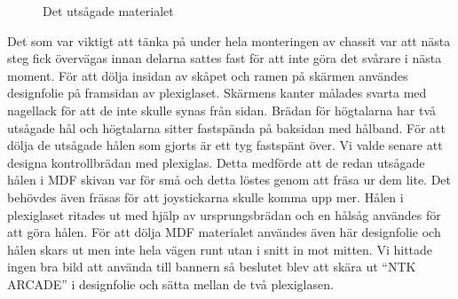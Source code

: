 \documentclass[12pt,fleqn,openany]{book} %
\begin{document}
\begin{table}[h]
\centering
\caption{Material som användes}
\label{table_material}
\end{table}

\begin{wrapfigure}[17]{R}{0.35\textwidth}
  \begin{center}
  \end{center}
  \caption{Det utsågade materialet}
  \label{fig_material}
\end{wrapfigure}
\newpage
Det som var viktigt att tänka på under hela monteringen av chassit var att nästa steg fick övervägas innan delarna sattes fast 
för att inte göra det svårare i nästa moment. För att dölja insidan av skåpet och ramen på skärmen användes designfolie på framsidan 
av plexiglaset. Skärmens kanter målades svarta med nagellack för att de inte skulle synas från sidan. Brädan för högtalarna har två
utsågade hål och högtalarna sitter fastspända på baksidan med hålband. För att dölja de utsågade hålen som gjorts är ett tyg fastspänt
över. Vi valde senare att designa kontrollbrädan med plexiglas. Detta medförde att de redan utsågade hålen i MDF skivan var för små 
och detta löstes genom att fräsa ur dem lite. Det behövdes även fräsas för att joystickarna skulle komma upp mer. Hålen i plexiglaset
ritades ut med hjälp av ursprungsbrädan och en hålsåg användes för att göra hålen. För att dölja MDF materialet användes även här 
designfolie och hålen skars ut men inte hela vägen runt utan i snitt in mot mitten. Vi hittade ingen bra bild att använda till bannern 
så beslutet blev att skära ut “NTK ARCADE” i designfolie och sätta mellan de två plexiglasen.
\end{document}
